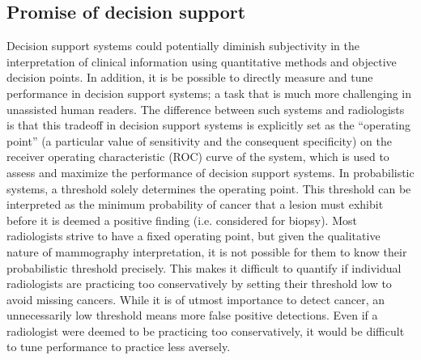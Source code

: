 \subsection{Promise of decision support}
Decision support systems could potentially diminish subjectivity in the interpretation of clinical information using quantitative methods and objective decision points. In addition, it is be possible to directly measure and tune performance in decision support systems; a task that is much more challenging in unassisted human readers. The difference between such systems and radiologists is that this tradeoff in decision support systems is explicitly set as the “operating point” (a particular value of sensitivity and the consequent specificity) on the receiver operating characteristic (ROC) curve of the system, which is used to assess and maximize the performance of decision support systems. In probabilistic systems, a threshold solely determines the operating point. This threshold can be interpreted as the minimum probability of cancer that a lesion must exhibit before it is deemed a positive finding (i.e. considered for biopsy). Most radiologists strive to have a fixed operating point, but given the qualitative nature of mammography interpretation, it is not possible for them to know their probabilistic threshold precisely. This makes it difficult to quantify if individual radiologists are practicing too conservatively by setting their threshold low to avoid missing cancers. While it is of utmost importance to detect cancer, an unnecessarily low threshold means more false positive detections. Even if a radiologist were deemed to be practicing too conservatively, it would be difficult to tune performance to practice less aversely.












